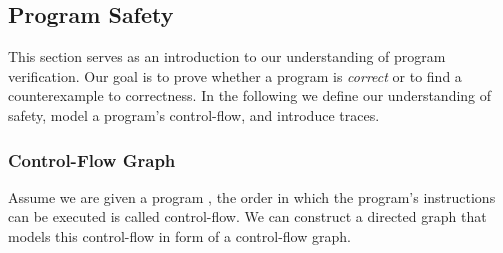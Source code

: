 \subsection{Program Safety}
This section serves as an introduction to our understanding of program verification. Our goal is to prove whether a program is \textsl{correct} or to find a counterexample to correctness. In the following we define our understanding of safety, model a program's control-flow, and introduce traces.
\subsubsection{Control-Flow Graph}
 Assume we are given a program \prg, the order in which the program's instructions can be executed is called control-flow. We can construct a directed graph that models this control-flow in form of a control-flow graph.
 
